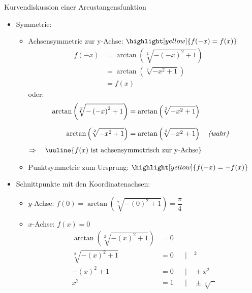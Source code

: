 \begin{Example}{Kurvendiskussion einer Arcustangensfunktion}{}
\begin{itemize}
{        }
    \item Symmetrie: \\[-2.0ex]{
        \begin{itemize}
            \item Achsensymmetrie zur y-Achse: \quad $\highlight[yellow]{f(-x) = f(x)}$\\[-1.0ex]{
                \begin{align*}
                    f(-x) &= \arctan\left(\sqrt[2]{-\left(-x\right)^{2} +1}\right) &&\\[1.5ex]
                    &= \arctan\left(\sqrt[2]{-x^{2} +1}\right) && \\[1.5ex]
                    &= f(x) &&
                \end{align*}
                oder:
                \begin{align*}
                    \arctan\left(\sqrt[2]{-\left(-x\right)^{2} +1}\right) &= \arctan\left(\sqrt[2]{-x^{2} +1}\right) &&\\[1.5ex]
                    \arctan\left(\sqrt[2]{-x^{2} +1}\right) &= \arctan\left(\sqrt[2]{-x^{2} +1}\right) \quad \text{\textit{(wahr)}} &&
                \end{align*}
                $\Rightarrow \quad \uuline{f(x) \text{ ist achsensymmetrisch zur y-Achse}}$
                }
            \item Punktsymmetrie zum Ursprung: \quad $\highlight[yellow]{f(-x) = -f(x)}$
        \end{itemize}
        }
    \item Schnittpunkte mit den Koordinatenachsen: \\[-2.0ex]{
        \begin{itemize}
            \item $y$-Achse: \quad $f(0) = \arctan\left(\sqrt[2]{-\left(0\right)^{2} +1}\right) = \dfrac{\pi}{4}$
            \item $x$-Achse: \quad $f(x) = 0$ \\[-2.0ex]{
                \begin{align*}
                    \arctan\left(\sqrt[2]{-\left(x\right)^{2} +1}\right) &= 0 &&\\[1.5ex]
                    \sqrt[2]{-\left(x\right)^{2} +1} &= 0 &&| \quad ^{2}\\[1.5ex]
                    -\left(x\right)^{2} +1 &= 0 &&| \quad + x^{2}\\[1.5ex]
                    x^{2} &= 1 &&| \quad \pm \sqrt[2]{\phantom{x}}
                \end{align*}
}
\end{itemize}}
\end{itemize}
\end{Example}
